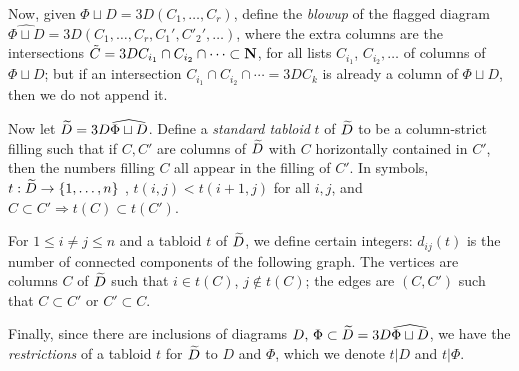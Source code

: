 Now, given $\Phi \sqcup D =3D (C_1,\ldots,C_r)$,
define the {\em blowup} of the flagged diagram
$\widehat{\Phi \sqcup D} =3D (C_1, \ldots, C_r,
{C}_1', {C'}_2', \ldots)$,
where the extra columns  are the intersections
$\tilde{C} =3D  C_{i_1} \cap C_{i_2} \cap \cdots \subset {\bf N}$,
for all lists $C_{i_1}$, $C_{i_2}, \ldots$ of columns of
$\Phi \sqcup D $;
but if an intersection $C_{i_1} \cap C_{i_2} \cap \cdots =3D C_k$
is already a column of $\Phi \sqcup D$, then we do not append it.

Now let
$ \widetilde{D} =3D \widehat{\Phi \sqcup D} $.
Define a {\em standard tabloid} $t$ of
$ \widetilde{D} $
to be a column-strict filling
such that if $C, C'$ are columns of
$ \widetilde{D} $
with $C$ horizontally contained in $C'$,
then the numbers filling $C$
all appear in the filling of $C'$.
In symbols,
$t : \widetilde{D} \rightarrow \{1,\ldots,n\}$ ,
$t(i,j) < t(i+1,j)$ for all $i, j$,
and
$C \subset C' \Rightarrow t(C) \subset t(C')$.

For $1 \leq i \neq j \leq n$
and a tabloid $t$ of
$ \widetilde{D} $,
we
define certain integers: $d_{ij}(t)$
 is the number of connected components of
the following graph.
The vertices are columns $C$ of
$ \widetilde{D} $
such that $i \in t(C)$,  $j \not\in t(C)$;
the edges are $(C,C')$ such that $C \subset C'$
or $C' \subset C$.

Finally, since there are inclusions of diagrams
$D,\, \Phi \subset \widetilde{D} =3D  \widehat{\Phi \sqcup D}$,
we have the {\em restrictions} of
a tabloid $t$ for $\widetilde{D}$
to $D$ and $\Phi$, which we denote $t|D$ and $t|\Phi$.

